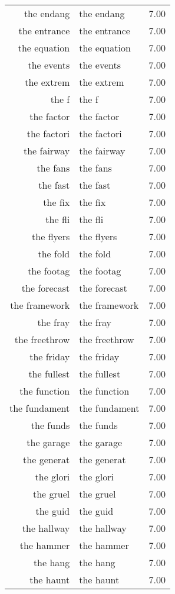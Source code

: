 \begin{table}[ht]
\begin{tabular}{rlr}
  the endang & the endang & 7.00 \\ 
  the entrance & the entrance & 7.00 \\ 
  the equation & the equation & 7.00 \\ 
  the events & the events & 7.00 \\ 
  the extrem & the extrem & 7.00 \\ 
  the f & the f & 7.00 \\ 
  the factor & the factor & 7.00 \\ 
  the factori & the factori & 7.00 \\ 
  the fairway & the fairway & 7.00 \\ 
  the fans & the fans & 7.00 \\ 
  the fast & the fast & 7.00 \\ 
  the fix & the fix & 7.00 \\ 
  the fli & the fli & 7.00 \\ 
  the flyers & the flyers & 7.00 \\ 
  the fold & the fold & 7.00 \\ 
  the footag & the footag & 7.00 \\ 
  the forecast & the forecast & 7.00 \\ 
  the framework & the framework & 7.00 \\ 
  the fray & the fray & 7.00 \\ 
  the freethrow & the freethrow & 7.00 \\ 
  the friday & the friday & 7.00 \\ 
  the fullest & the fullest & 7.00 \\ 
  the function & the function & 7.00 \\ 
  the fundament & the fundament & 7.00 \\ 
  the funds & the funds & 7.00 \\ 
  the garage & the garage & 7.00 \\ 
  the generat & the generat & 7.00 \\ 
  the glori & the glori & 7.00 \\ 
  the gruel & the gruel & 7.00 \\ 
  the guid & the guid & 7.00 \\ 
  the hallway & the hallway & 7.00 \\ 
  the hammer & the hammer & 7.00 \\ 
  the hang & the hang & 7.00 \\ 
  the haunt & the haunt & 7.00 \\ 

\end{tabular}
\end{table}
